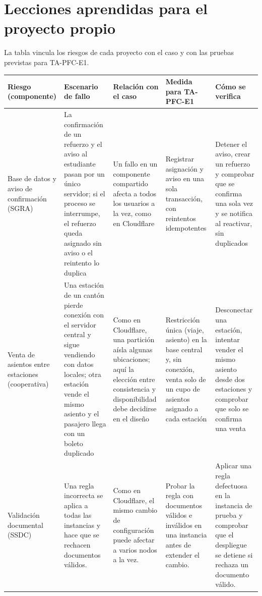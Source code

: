 \documentclass[10pt,a4paper]{article}
\begin{document}
\section{Lecciones aprendidas para el proyecto propio}
La tabla vincula los riesgos de cada proyecto con el caso y con las pruebas previstas para TA-PFC-E1.

\begin{bloquecentrado}
\footnotesize
\begin{tabularx}{\linewidth}{@{}>{\raggedright\arraybackslash}p{2.1cm}*{4}{>{\raggedright\arraybackslash}X}@{}}
\toprule
Riesgo (componente) & Escenario de fallo & Relación con el caso & Medida para TA-PFC-E1 & Cómo se verifica \\
\midrule
Base de datos y aviso de confirmación (SGRA) & La confirmación de un refuerzo y el aviso al estudiante pasan por un único servidor; si el proceso se interrumpe, el refuerzo queda asignado sin aviso o el reintento lo duplica & Un fallo en un componente compartido afecta a todos los usuarios a la vez, como en Cloudflare & Registrar asignación y aviso en una sola transacción, con reintentos idempotentes & Detener el aviso, crear un refuerzo y comprobar que se confirma una sola vez y se notifica al reactivar, sin duplicados \\
\addlinespace[2pt]
Venta de asientos entre estaciones (cooperativa) & Una estación de un cantón pierde conexión con el servidor central y sigue vendiendo con datos locales; otra estación vende el mismo asiento y el pasajero llega con un boleto duplicado & Como en Cloudflare, una partición aísla algunas ubicaciones; aquí la elección entre consistencia y disponibilidad debe decidirse en el diseño & Restricción única (viaje, asiento) en la base central y, sin conexión, venta solo de un cupo de asientos asignado a cada estación & Desconectar una estación, intentar vender el mismo asiento desde dos estaciones y comprobar que solo se confirma una venta \\
\addlinespace[2pt]
Validación documental (SSDC) &
Una regla incorrecta se aplica a todas las instancias y hace que se rechacen documentos válidos. &
Como en Cloudflare, el mismo cambio de configuración puede afectar a varios nodos a la vez. &
Probar la regla con documentos válidos e inválidos en una instancia antes de extender el cambio. &
Aplicar una regla defectuosa en la instancia de prueba y comprobar que el despliegue se detiene si rechaza un documento válido. \\

\end{tabularx}
\end{bloquecentrado}
\end{document}
